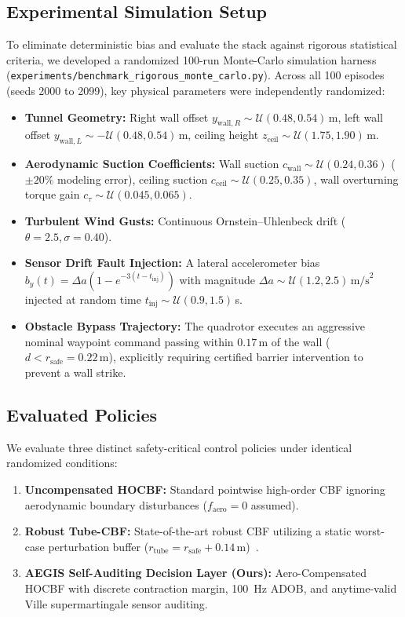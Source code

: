 \documentclass[11pt,a4paper]{article}
\begin{document}
\subsection{Experimental Simulation Setup}
To eliminate deterministic bias and evaluate the stack against rigorous statistical criteria, we developed a randomized 100-run Monte-Carlo simulation harness (\texttt{experiments/benchmark\_rigorous\_monte\_carlo.py}). Across all 100 episodes (seeds 2000 to 2099), key physical parameters were independently randomized:
\begin{itemize}[leftmargin=16pt, itemsep=2pt]
    \item \textbf{Tunnel Geometry:} Right wall offset $y_{\text{wall}, R} \sim \mathcal{U}(0.48, 0.54)\,$m, left wall offset $y_{\text{wall}, L} \sim -\mathcal{U}(0.48, 0.54)\,$m, ceiling height $z_{\text{ceil}} \sim \mathcal{U}(1.75, 1.90)\,$m.
    \item \textbf{Aerodynamic Suction Coefficients:} Wall suction $c_{\text{wall}} \sim \mathcal{U}(0.24, 0.36)$ ($\pm 20\%$ modeling error), ceiling suction $c_{\text{ceil}} \sim \mathcal{U}(0.25, 0.35)$, wall overturning torque gain $c_{\tau} \sim \mathcal{U}(0.045, 0.065)$.
    \item \textbf{Turbulent Wind Gusts:} Continuous Ornstein--Uhlenbeck drift ($\theta = 2.5, \sigma = 0.40$).
    \item \textbf{Sensor Drift Fault Injection:} A lateral accelerometer bias $b_y(t) = \Delta a (1 - e^{-3(t - t_{\text{inj}})})$ with magnitude $\Delta a \sim \mathcal{U}(1.2, 2.5)\,\text{m/s}^2$ injected at random time $t_{\text{inj}} \sim \mathcal{U}(0.9, 1.5)\,$s.
    \item \textbf{Obstacle Bypass Trajectory:} The quadrotor executes an aggressive nominal waypoint command passing within $0.17\,$m of the wall ($d < r_{\text{safe}} = 0.22\,$m), explicitly requiring certified barrier intervention to prevent a wall strike.
\end{itemize}

\subsection{Evaluated Policies}
We evaluate three distinct safety-critical control policies under identical randomized conditions:
\begin{enumerate}[leftmargin=18pt, itemsep=2pt]
    \item \textbf{Uncompensated HOCBF:} Standard pointwise high-order CBF ignoring aerodynamic boundary disturbances ($f_{\text{aero}} = 0$ assumed).
    \item \textbf{Robust Tube-CBF:} State-of-the-art robust CBF utilizing a static worst-case perturbation buffer ($r_{\text{tube}} = r_{\text{safe}} + 0.14\,\text{m}$)~\cite{gurriet2018towards}.
    \item \textbf{AEGIS Self-Auditing Decision Layer (Ours):} Aero-Compensated HOCBF with discrete contraction margin, 100~Hz ADOB, and anytime-valid Ville supermartingale sensor auditing.
\end{enumerate}
\end{document}
